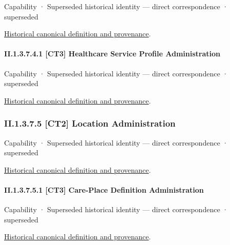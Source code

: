\label{element:f1ab1258cf2944efb50105e7885f8027}
{\small Capability · Superseded historical identity — direct correspondence · superseded}\par
\href{../../../../continuum/strategy/capability/f1ab1258cf2944efb50105e7885f8027.md}{Historical canonical definition and provenance}.\par
\paragraph*{II.1.3.7.4.1 [CT3] Healthcare Service Profile Administration}
\label{navigation:II.1.3.7.4.1}

\label{element:7780ca2fed2346439d5f559d00cc4ee4}
{\small Capability · Superseded historical identity — direct correspondence · superseded}\par
\href{../../../../continuum/strategy/capability/7780ca2fed2346439d5f559d00cc4ee4.md}{Historical canonical definition and provenance}.\par
\subsubsection*{II.1.3.7.5 [CT2] Location Administration}
\label{navigation:II.1.3.7.5}

\label{element:d412aff3a5c64e6aaba910d4c2c9356d}
{\small Capability · Superseded historical identity — direct correspondence · superseded}\par
\href{../../../../continuum/strategy/capability/d412aff3a5c64e6aaba910d4c2c9356d.md}{Historical canonical definition and provenance}.\par
\paragraph*{II.1.3.7.5.1 [CT3] Care-Place Definition Administration}
\label{navigation:II.1.3.7.5.1}

\label{element:a3464bd9c0dc4a01b50803acc7705b4e}
{\small Capability · Superseded historical identity — direct correspondence · superseded}\par
\href{../../../../continuum/strategy/capability/a3464bd9c0dc4a01b50803acc7705b4e.md}{Historical canonical definition and provenance}.\par
